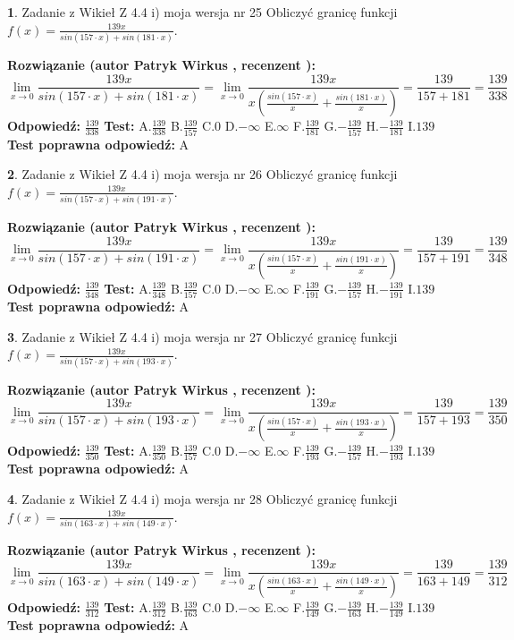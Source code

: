 \documentclass[12pt, a4paper]{article}
\theoremstyle{definition} %
\newtheorem{zad}{}
\newcommand{\zadStart}[1]{\begin{zad}#1\newline}
\newcommand{\zadStop}{\end{zad}}
\newcommand{\rozwStart}[2]{\noindent \textbf{Rozwiązanie (autor #1 , recenzent #2): }\newline}
\newcommand{\rozwStop}{\newline}
\newcommand{\odpStart}{\noindent \textbf{Odpowiedź:}\newline}
\newcommand{\odpStop}{\newline}
\newcommand{\testStart}{\noindent \textbf{Test:}\newline}
\newcommand{\testStop}{\newline}
\newcommand{\kluczStart}{\noindent \textbf{Test poprawna odpowiedź:}\newline}
\newcommand{\kluczStop}{\newline}
\begin{document}
\zadStart{Zadanie z Wikieł Z 4.4 i) moja wersja nr 25}
Obliczyć granicę funkcji $f(x)=\frac{139x}{sin(157\cdot x) +sin(181\cdot x)}$.
\zadStop
\rozwStart{Patryk Wirkus}{}
$$\lim\limits_{x\to 0}\frac{139x}{sin(157\cdot x) +sin(181\cdot x)}=\lim\limits_{x\to 0}\frac{139x}{x(\frac{sin(157\cdot x)}{x}+\frac{sin(181\cdot x)}{x})}=\frac{139}{157+181} = \frac{139}{338}$$
\rozwStop
\odpStart
$\frac{139}{338}$
\odpStop
\testStart
A.$\frac{139}{338}$
B.$\frac{139}{157}$
C.$0$
D.$-\infty$
E.$\infty$
F.$\frac{139}{181}$
G.$-\frac{139}{157}$
H.$-\frac{139}{181}$
I.$139$
\testStop
\kluczStart
A
\kluczStop



\zadStart{Zadanie z Wikieł Z 4.4 i) moja wersja nr 26}
Obliczyć granicę funkcji $f(x)=\frac{139x}{sin(157\cdot x) +sin(191\cdot x)}$.
\zadStop
\rozwStart{Patryk Wirkus}{}
$$\lim\limits_{x\to 0}\frac{139x}{sin(157\cdot x) +sin(191\cdot x)}=\lim\limits_{x\to 0}\frac{139x}{x(\frac{sin(157\cdot x)}{x}+\frac{sin(191\cdot x)}{x})}=\frac{139}{157+191} = \frac{139}{348}$$
\rozwStop
\odpStart
$\frac{139}{348}$
\odpStop
\testStart
A.$\frac{139}{348}$
B.$\frac{139}{157}$
C.$0$
D.$-\infty$
E.$\infty$
F.$\frac{139}{191}$
G.$-\frac{139}{157}$
H.$-\frac{139}{191}$
I.$139$
\testStop
\kluczStart
A
\kluczStop



\zadStart{Zadanie z Wikieł Z 4.4 i) moja wersja nr 27}
Obliczyć granicę funkcji $f(x)=\frac{139x}{sin(157\cdot x) +sin(193\cdot x)}$.
\zadStop
\rozwStart{Patryk Wirkus}{}
$$\lim\limits_{x\to 0}\frac{139x}{sin(157\cdot x) +sin(193\cdot x)}=\lim\limits_{x\to 0}\frac{139x}{x(\frac{sin(157\cdot x)}{x}+\frac{sin(193\cdot x)}{x})}=\frac{139}{157+193} = \frac{139}{350}$$
\rozwStop
\odpStart
$\frac{139}{350}$
\odpStop
\testStart
A.$\frac{139}{350}$
B.$\frac{139}{157}$
C.$0$
D.$-\infty$
E.$\infty$
F.$\frac{139}{193}$
G.$-\frac{139}{157}$
H.$-\frac{139}{193}$
I.$139$
\testStop
\kluczStart
A
\kluczStop



\zadStart{Zadanie z Wikieł Z 4.4 i) moja wersja nr 28}
Obliczyć granicę funkcji $f(x)=\frac{139x}{sin(163\cdot x) +sin(149\cdot x)}$.
\zadStop
\rozwStart{Patryk Wirkus}{}
$$\lim\limits_{x\to 0}\frac{139x}{sin(163\cdot x) +sin(149\cdot x)}=\lim\limits_{x\to 0}\frac{139x}{x(\frac{sin(163\cdot x)}{x}+\frac{sin(149\cdot x)}{x})}=\frac{139}{163+149} = \frac{139}{312}$$
\rozwStop
\odpStart
$\frac{139}{312}$
\odpStop
\testStart
A.$\frac{139}{312}$
B.$\frac{139}{163}$
C.$0$
D.$-\infty$
E.$\infty$
F.$\frac{139}{149}$
G.$-\frac{139}{163}$
H.$-\frac{139}{149}$
I.$139$
\testStop
\kluczStart
A
\kluczStop
\end{document}
